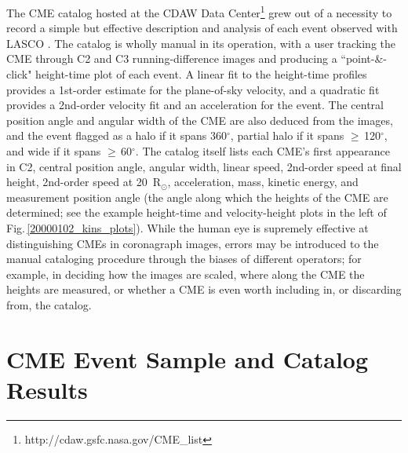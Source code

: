 \documentclass[referee,a4paper,12pt,traditabstract]{swsc}
\begin{document}
\begin{linenumbers}
The CME catalog hosted at the CDAW Data Center\footnote{http://cdaw.gsfc.nasa.gov/CME\_list}  grew out of a necessity to record a simple but effective description and analysis of each event observed with LASCO \citep{2009EM&P..104..295G}. The catalog is wholly manual in its operation, with a user tracking the CME through C2 and C3 running-difference images and producing a ``point-\&-click" height-time plot of each event. A linear fit to the height-time profiles provides a 1st-order estimate for the plane-of-sky velocity, and a quadratic fit provides a 2nd-order velocity fit and an acceleration for the event. The central position angle and angular width of the CME are also deduced from the images, and the event flagged as a halo if it spans 360$^{\circ}$, partial halo if it spans $\ge$\,120$^{\circ}$, and wide if it spans $\ge$\,60$^{\circ}$. The catalog itself lists each CME's first appearance in C2, central position angle, angular width, linear speed, 2nd-order speed at final height, 2nd-order speed at 20~R$_{\odot}$, acceleration, mass, kinetic energy, and measurement position angle (the angle along which the heights of the CME are determined; see the example height-time and velocity-height plots in the left of Fig.\,\ref{20000102_kins_plots}). While the human eye is supremely effective at distinguishing CMEs in coronagraph images, errors may be introduced to the manual cataloging procedure through the biases of different operators; for example, in deciding how the images are scaled, where along the CME the heights are measured, or whether a CME is even worth including in, or discarding from, the catalog. %




\section{CME Event Sample and Catalog Results}
\label{sect_events}


\end{linenumbers}
\end{document}
